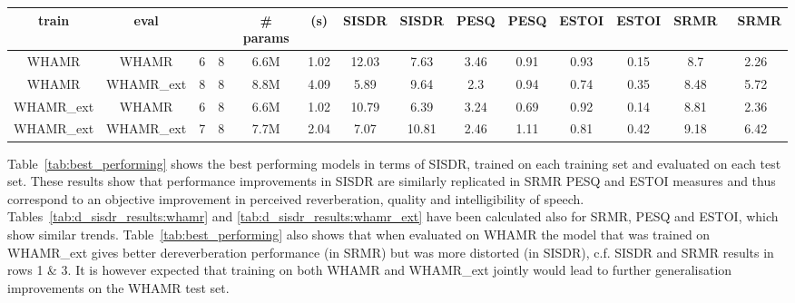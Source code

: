 \documentclass[conference,a4paper]{IEEEtran}
\begin{document}
\begin{table*}[h]
\setlength\tabcolsep{4pt}
\centering
\begin{tabular}{|c|c|cc|cc|cc|cc|cc|cc|}
\hline
\bfseries \cellcolor[HTML]{C0C0C0}train & \bfseries \cellcolor[HTML]{C0C0C0}eval &  \cellcolor[HTML]{C0C0C0} & \cellcolor[HTML]{C0C0C0} & \bfseries \cellcolor[HTML]{C0C0C0}\# params & \cellcolor[HTML]{C0C0C0} \bfseries (s) & \cellcolor[HTML]{C0C0C0}\bfseries \ac{SISDR} & \cellcolor[HTML]{C0C0C0} \bfseries  \ac{SISDR} & \cellcolor[HTML]{C0C0C0} \bfseries PESQ & \cellcolor[HTML]{C0C0C0} \bfseries  PESQ & \cellcolor[HTML]{C0C0C0} \bfseries ESTOI & \cellcolor[HTML]{C0C0C0} \bfseries  ESTOI & \cellcolor[HTML]{C0C0C0} \bfseries \ac{SRMR} & \cellcolor[HTML]{C0C0C0} \bfseries ~SRMR \\ \hline
WHAMR & WHAMR & 6 & 8 & 6.6M & 1.02 & 12.03 & 7.63 & 3.46 & 0.91 & 0.93 & 0.15 & 8.7 & 2.26 \\ \hline
WHAMR & WHAMR\_ext & 8 & 8 & 8.8M & 4.09 & 5.89 & 9.64 & 2.3 & 0.94 & 0.74 & 0.35 & 8.48 & 5.72 \\ \hline
WHAMR\_ext & WHAMR & 6 & 8 & 6.6M & 1.02 & 10.79 & 6.39 & 3.24 & 0.69 & 0.92 & 0.14 & 8.81 & 2.36 \\ \hline
WHAMR\_ext & WHAMR\_ext & 7 & 8 & 7.7M & 2.04 & 7.07 & 10.81 & 2.46 & 1.11 & 0.81 & 0.42 & 9.18 & 6.42 \\ \hline
\end{tabular}
\caption{Best performing models for models trained on WHAMR and WHAMR\_ext evaluated on each test set.}
\label{tab:best_performing}
\end{table*}
Table~\ref{tab:best_performing} shows the best performing models in terms of SISDR, trained on each training set and evaluated on each test set. These results show that performance improvements in \ac{SISDR} are similarly replicated in \ac{SRMR} \ac{PESQ} and \ac{ESTOI} measures and thus correspond to an objective improvement in {perceived reverberation,} quality and intelligibility of speech. 
Tables~\ref{tab:d_sisdr_results:whamr} and \ref{tab:d_sisdr_results:whamr_ext} have been calculated also for \ac{SRMR}, \ac{PESQ} and \ac{ESTOI}, which show similar trends. Table~\ref{tab:best_performing} also shows that when evaluated on WHAMR the model that was trained on WHAMR\_ext gives better dereverberation performance (in \ac{SRMR}) but was more distorted (in \ac{SISDR}), c.f. \ac{SISDR} and \ac{SRMR} results in rows 1 \& 3. It is however expected that training on both WHAMR and WHAMR\_ext jointly would lead to further generalisation improvements on the WHAMR test set.
\end{document}
